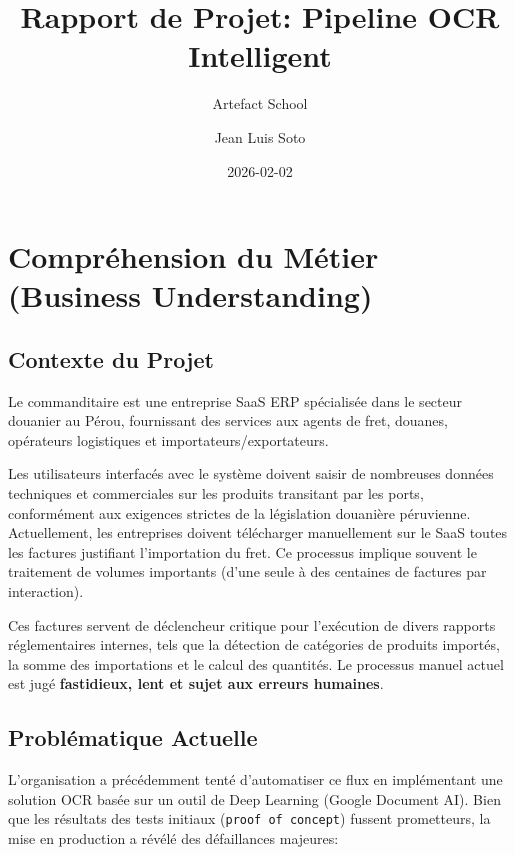 \documentclass[
  letterpaper,
  DIV=11,
  numbers=noendperiod]{scrartcl}
\title{Rapport de Projet: Pipeline OCR Intelligent}
\subtitle{Artefact School}
\author{Jean Luis Soto}
\date{2026-02-02}
\renewcommand*\contentsname{Table of contents}
\newcommand\contentsname{Table of contents}
\begin{document}
\maketitle

\renewcommand*\contentsname{Table of contents}
{
\hypersetup{linkcolor=}
\setcounter{tocdepth}{3}
\tableofcontents
}

\section{Compréhension du Métier (Business
Understanding)}\label{compruxe9hension-du-muxe9tier-business-understanding}

\subsection{Contexte du Projet}\label{contexte-du-projet}

Le commanditaire est une entreprise SaaS ERP spécialisée dans le secteur
douanier au Pérou, fournissant des services aux agents de fret, douanes,
opérateurs logistiques et importateurs/exportateurs.

Les utilisateurs interfacés avec le système doivent saisir de nombreuses
données techniques et commerciales sur les produits transitant par les
ports, conformément aux exigences strictes de la législation douanière
péruvienne. Actuellement, les entreprises doivent télécharger
manuellement sur le SaaS toutes les factures justifiant l'importation du
fret. Ce processus implique souvent le traitement de volumes importants
(d'une seule à des centaines de factures par interaction).

Ces factures servent de déclencheur critique pour l'exécution de divers
rapports réglementaires internes, tels que la détection de catégories de
produits importés, la somme des importations et le calcul des quantités.
Le processus manuel actuel est jugé \textbf{fastidieux, lent et sujet
aux erreurs humaines}.

\subsection{Problématique Actuelle}\label{probluxe9matique-actuelle}

L'organisation a précédemment tenté d'automatiser ce flux en
implémentant une solution OCR basée sur un outil de Deep Learning
(Google Document AI). Bien que les résultats des tests initiaux
(\texttt{proof\ of\ concept}) fussent prometteurs, la mise en production
a révélé des défaillances majeures:
\end{document}
